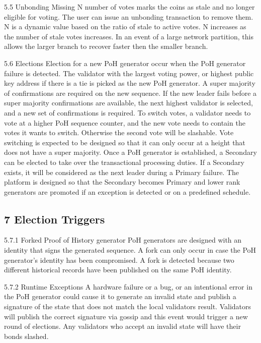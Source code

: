 \documentclass[11pt]{article}
\begin{document}
5.5 Unbonding Missing N number of votes marks the coins as stale and no longer eligible for voting. The user can issue an unbonding transaction to remove them. N is a dynamic value based on the ratio of stale to active votes. N increases as the number of stale votes increases. In an event of a large network partition, this allows the larger branch to recover faster then the smaller branch.


5.6 Elections Election for a new PoH generator occur when the PoH generator failure is detected. The validator with the largest voting power, or highest public key address if there is a tie is picked as the new PoH generator. A super majority of confirmations are required on the new sequence. If the new leader fails before a super majority confirmations are available, the next highest validator is selected, and a new set of confirmations is required. To switch votes, a validator needs to vote at a higher PoH sequence counter, and the new vote needs to contain the votes it wants to switch. Otherwise the second vote will be slashable. Vote switching is expected to be designed so that it can only occur at a height that does not have a super majority. Once a PoH generator is established, a Secondary can be elected to take over the transactional processing duties. If a Secondary exists, it will be considered as the next leader during a Primary failure. The platform is designed so that the Secondary becomes Primary and lower rank generators are promoted if an exception is detected or on a predefined schedule.


\subsection{7 Election Triggers}

5.7.1 Forked Proof of History generator PoH generators are designed with an identity that signs the generated sequence. A fork can only occur in case the PoH generator's identity has been compromised. A fork is detected because two different historical records have been published on the same PoH identity.


5.7.2 Runtime Exceptions A hardware failure or a bug, or an intentional error in the PoH generator could cause it to generate an invalid state and publish a signature of the state that does not match the local validators result. Validators will publish the correct signature via gossip and this event would trigger a new round of elections. Any validators who accept an invalid state will have their bonds slashed.
\end{document}
